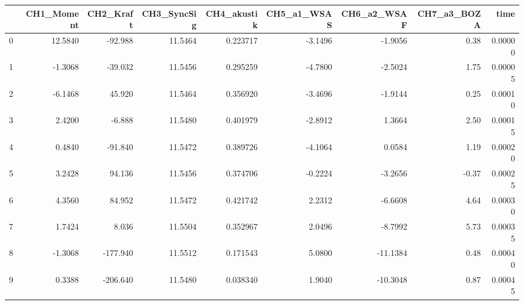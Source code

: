 \begin{tabular}{lrrrrrrrr}
\toprule
{} &  CH1\_Moment &  CH2\_Kraft &  CH3\_SyncSig &  CH4\_akustik &  CH5\_a1\_WSAS &  CH6\_a2\_WSAF &  CH7\_a3\_BOZA &     time \\
\midrule
0 &     12.5840 &    -92.988 &      11.5464 &     0.223717 &      -3.1496 &      -1.9056 &         0.38 &  0.00000 \\
1 &     -1.3068 &    -39.032 &      11.5456 &     0.295259 &      -4.7800 &      -2.5024 &         1.75 &  0.00005 \\
2 &     -6.1468 &     45.920 &      11.5464 &     0.356920 &      -3.4696 &      -1.9144 &         0.25 &  0.00010 \\
3 &      2.4200 &     -6.888 &      11.5480 &     0.401979 &      -2.8912 &       1.3664 &         2.50 &  0.00015 \\
4 &      0.4840 &    -91.840 &      11.5472 &     0.389726 &      -4.1064 &       0.0584 &         1.19 &  0.00020 \\
5 &      3.2428 &     94.136 &      11.5456 &     0.374706 &      -0.2224 &      -3.2656 &        -0.37 &  0.00025 \\
6 &      4.3560 &     84.952 &      11.5472 &     0.421742 &       2.2312 &      -6.6608 &         4.64 &  0.00030 \\
7 &      1.7424 &      8.036 &      11.5504 &     0.352967 &       2.0496 &      -8.7992 &         5.73 &  0.00035 \\
8 &     -1.3068 &   -177.940 &      11.5512 &     0.171543 &       5.0800 &     -11.1384 &         0.48 &  0.00040 \\
9 &      0.3388 &   -206.640 &      11.5480 &     0.038340 &       1.9040 &     -10.3048 &         0.87 &  0.00045 \\
\bottomrule
\end{tabular}
